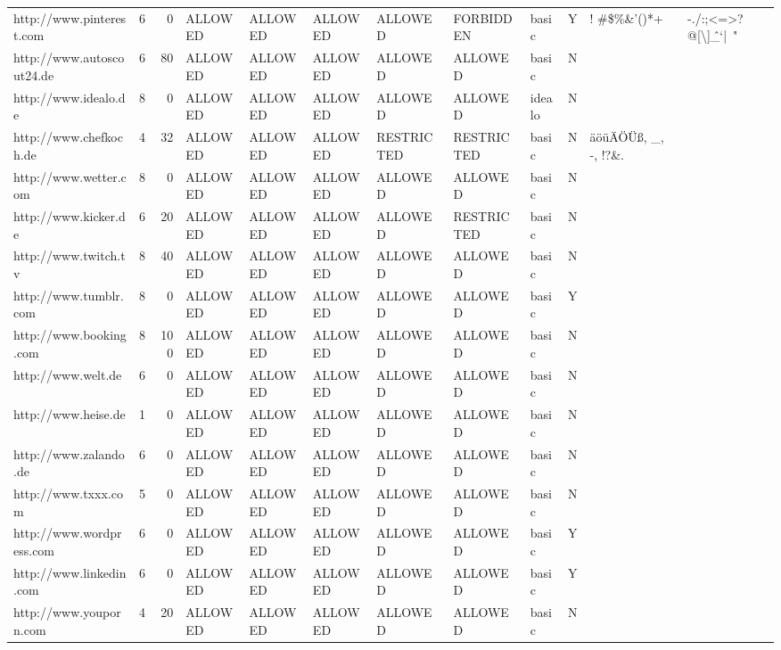 \begin{table}[htbp]
{{\begin{tabular}{lrrlllllllrr}
    http://www.pinterest.com & 6     & 0     & ALLOWED & ALLOWED & ALLOWED & ALLOWED & FORBIDDEN & basic & Y     & \multicolumn{1}{l}{! \#\$\%\&'()*+} & \multicolumn{1}{l}{-./:;<=>?@[\textbackslash{}]\^\_`{|}~"} \\
    http://www.autoscout24.de & 6     & 80    & ALLOWED & ALLOWED & ALLOWED & ALLOWED & ALLOWED & basic & N     &       &  \\
    http://www.idealo.de & 8     & 0     & ALLOWED & ALLOWED & ALLOWED & ALLOWED & ALLOWED & idealo & N     &       &  \\
    http://www.chefkoch.de & 4     & 32    & ALLOWED & ALLOWED & ALLOWED & RESTRICTED & RESTRICTED & basic & N     & \multicolumn{1}{l}{äöüÄÖÜß, \_, -, !?\&.} &  \\
    http://www.wetter.com & 8     & 0     & ALLOWED & ALLOWED & ALLOWED & ALLOWED & ALLOWED & basic & N     &       &  \\
    http://www.kicker.de & 6     & 20    & ALLOWED & ALLOWED & ALLOWED & ALLOWED & RESTRICTED & basic & N     &       &  \\
    http://www.twitch.tv & 8     & 40    & ALLOWED & ALLOWED & ALLOWED & ALLOWED & ALLOWED & basic & N     &       &  \\
    http://www.tumblr.com & 8     & 0     & ALLOWED & ALLOWED & ALLOWED & ALLOWED & ALLOWED & basic & Y     &       &  \\
    http://www.booking.com & 8     & 100   & ALLOWED & ALLOWED & ALLOWED & ALLOWED & ALLOWED & basic & N     &       &  \\
    http://www.welt.de & 6     & 0     & ALLOWED & ALLOWED & ALLOWED & ALLOWED & ALLOWED & basic & N     &       & \multicolumn{1}{l}{ } \\
    http://www.heise.de & 1     & 0     & ALLOWED & ALLOWED & ALLOWED & ALLOWED & ALLOWED & basic & N     &       &  \\
    http://www.zalando.de & 6     & 0     & ALLOWED & ALLOWED & ALLOWED & ALLOWED & ALLOWED & basic & N     &       &  \\
    http://www.txxx.com & 5     & 0     & ALLOWED & ALLOWED & ALLOWED & ALLOWED & ALLOWED & basic & N     &       &  \\
    http://www.wordpress.com & 6     & 0     & ALLOWED & ALLOWED & ALLOWED & ALLOWED & ALLOWED & basic & Y     &       &  \\
    http://www.linkedin.com & 6     & 0     & ALLOWED & ALLOWED & ALLOWED & ALLOWED & ALLOWED & basic & Y     &       &  \\
    http://www.youporn.com & 4     & 20    & ALLOWED & ALLOWED & ALLOWED & ALLOWED & ALLOWED & basic & N     &       &  \\

\end{tabular}}}
\end{table}
